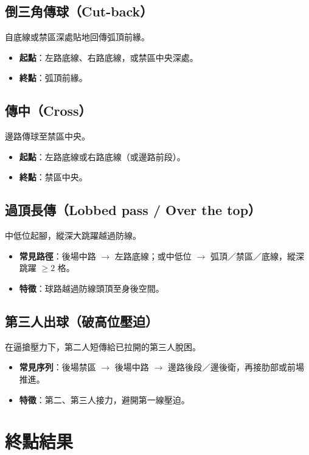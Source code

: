 \documentclass[11pt]{article}
\newcommand{\term}[1]{\textbf{#1}}
\begin{document}
\subsection*{\term{倒三角傳球}（Cut-back）}
自底線或禁區深處貼地回傳弧頂前緣。
\begin{itemize}
  \item \textbf{起點}：左路底線、右路底線，或禁區中央深處。
  \item \textbf{終點}：弧頂前緣。
\end{itemize}

\subsection*{\term{傳中}（Cross）}
邊路傳球至禁區中央。
\begin{itemize}
  \item \textbf{起點}：左路底線或右路底線（或邊路前段）。
  \item \textbf{終點}：禁區中央。
\end{itemize}

\subsection*{\term{過頂長傳}（Lobbed pass / Over the top）}
中低位起腳，縱深大跳躍越過防線。
\begin{itemize}
  \item \textbf{常見路徑}：後場中路 $\rightarrow$ 左路底線；或中低位 $\rightarrow$ 弧頂／禁區／底線，縱深跳躍 $\geq 2$ 格。
  \item \textbf{特徵}：球路越過防線頭頂至身後空間。
\end{itemize}

\subsection*{\term{第三人出球}（破高位壓迫）}
在逼搶壓力下，第二人短傳給已拉開的第三人脫困。
\begin{itemize}
  \item \textbf{常見序列}：後場禁區 $\rightarrow$ 後場中路 $\rightarrow$ 邊路後段／邊後衛，再接肋部或前場推進。
  \item \textbf{特徵}：第二、第三人接力，避開第一線壓迫。
\end{itemize}

\section{終點結果}
\end{document}
